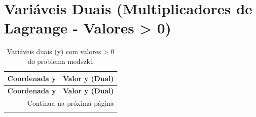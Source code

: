 \documentclass[12pt]{article}
\begin{document}
\section{Variáveis Duais (Multiplicadores de Lagrange - Valores > 0)}

\begin{longtable}{@{}cc@{}}
\caption{Variáveis duais (y) com valores > 0 do problema modszk1} \\
\toprule
\textbf{Coordenada y} & \textbf{Valor y (Dual)} \\
\midrule
\endfirsthead

\toprule
\textbf{Coordenada y} & \textbf{Valor y (Dual)} \\
\midrule
\endhead

\midrule \multicolumn{2}{r}{{Continua na próxima página}} \\ \midrule
\endfoot


\end{longtable}
\end{document}
